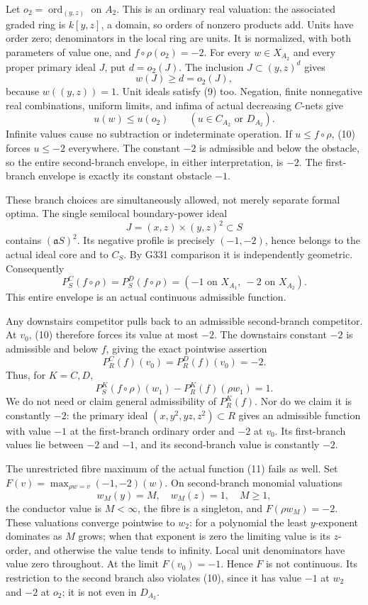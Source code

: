 Let \(o_2=\operatorname{ord}_{(y,z)}\) on \(A_2\).
This is an ordinary real valuation: the associated graded ring is
\(k[y,z]\), a domain, so orders of nonzero products add.
Units have order zero; denominators in the local ring are units.
It is normalized, with both parameters of value one, and
\(f\circ\rho(o_2)=-2\).
For every \(w\in X_{A_2}\) and every proper primary ideal \(J\),
put \(d=o_2(J)\). The inclusion \(J\subset(y,z)^d\) gives
\[
 w(J)\geq d=o_2(J),                                           \tag{9}
\]
because \(w((y,z))=1\). Unit ideals satisfy (9) too.
Negation, finite nonnegative real combinations, uniform limits,
and infima of actual decreasing \(C\)-nets give
\[
 u(w)\leq u(o_2)\qquad(u\in C_{A_2}\text{ or }D_{A_2}).         \tag{10}
\]
Infinite values cause no subtraction or indeterminate operation.
If \(u\leq f\circ\rho\), (10) forces \(u\leq-2\) everywhere.
The constant \(-2\) is admissible and below the obstacle, so the
entire second-branch envelope, in either interpretation, is \(-2\).
The first-branch envelope is exactly its constant obstacle \(-1\).

These branch choices are simultaneously allowed, not merely separate
formal optima. The single semilocal boundary-power ideal
\[
 J=(x,z)\times(y,z)^2\subset S
\]
contains \((\mathfrak aS)^2\). Its negative profile is precisely
\((-1,-2)\), hence belongs to the actual ideal core and to \(C_S\).
By G331 comparison it is independently geometric. Consequently
\[
 P_S^C(f\circ\rho)=P_S^D(f\circ\rho)
       =(-1\text{ on }X_{A_1},\ -2\text{ on }X_{A_2}).          \tag{11}
\]
This entire envelope is an actual continuous admissible function.

Any downstairs competitor pulls back to an admissible second-branch
competitor. At \(v_0\), (10) therefore forces its value at most
\(-2\). The downstairs constant \(-2\) is admissible and below \(f\),
giving the exact pointwise assertion
\[
 P_R^C(f)(v_0)=P_R^D(f)(v_0)=-2.                               \tag{12}
\]
Thus, for \(K=C,D\),
\[
 P_S^K(f\circ\rho)(w_1)-P_R^K(f)(\rho w_1)=1.                 \tag{13}
\]
We do not need or claim general admissibility of \(P_R^K(f)\).
Nor do we claim it is constantly \(-2\): the primary ideal
\((x,y^2,yz,z^2)\subset R\) gives an admissible function with
value \(-1\) at the first-branch ordinary order and \(-2\) at \(v_0\).
Its first-branch values lie between \(-2\) and \(-1\), and its
second-branch value is constantly \(-2\).

The unrestricted fibre maximum of the actual function (11) fails as
well. Set \(F(v)=\max_{\rho w=v}(-1,-2)(w)\).
On second-branch monomial valuations
\[
 w_M(y)=M,\quad w_M(z)=1,\quad M\geq1,
\]
the conductor value is \(M<\infty\), the fibre is a singleton, and
\(F(\rho w_M)=-2\). These valuations converge pointwise to \(w_2\):
for a polynomial the least \(y\)-exponent dominates as \(M\) grows;
when that exponent is zero the limiting value is its \(z\)-order,
and otherwise the value tends to infinity. Local unit denominators
have value zero throughout. At the limit \(F(v_0)=-1\).
Hence \(F\) is not continuous. Its restriction to the second
branch also violates (10), since it has value \(-1\) at \(w_2\)
and \(-2\) at \(o_2\); it is not even in \(D_{A_2}\).

